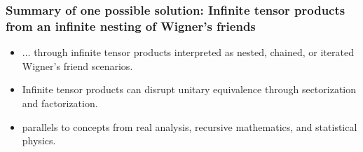 \documentclass[amsmath,table,sans,amsfonts,hyperref={colorlinks,citecolor=blue,linkcolor=blue,urlcolor=purple}]{beamer}
\begin{document}
\begin{frame}%
 \frametitle{Summary of one possible solution: Infinite tensor products from an infinite nesting of Wigner's friends}


{\Large
\begin{itemize}

\pause
\item  \color{magenta}
$\ldots$ through infinite tensor products interpreted as nested, chained, or iterated Wigner's friend scenarios.

\pause
\item  \color{magenta}
Infinite tensor products can disrupt unitary equivalence through sectorization and factorization.

\pause
\item  \color{magenta}
parallels to concepts from real analysis, recursive mathematics, and statistical physics.

\end{itemize}
}
\end{frame}

 
\end{document}
